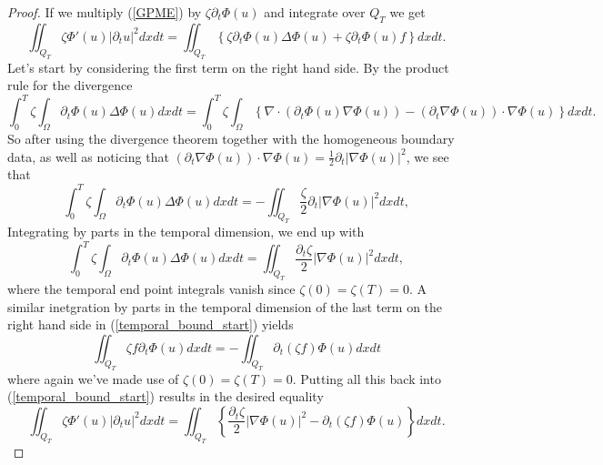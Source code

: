 \documentclass[11pt, a4paper]{article}
\begin{document}
\begin{proof}

 If we multiply (\ref{GPME}) by $\zeta \partial_t\Phi(u)$ and integrate over $Q_T$ we get
	\begin{equation}
	\label{temporal_bound_start}
	\iint_{Q_T}\zeta \Phi'(u)|\partial_t u|^2 dxdt = \iint_{Q_T} \left\{ \zeta \partial_t \Phi(u) \Delta \Phi(u)  + \zeta \partial_t \Phi(u) f \right\} dxdt.
	\end{equation}
	Let's start by considering the first term on the right hand side. By the product rule for the divergence
	\begin{equation*}
	\int_0^T \zeta \int_\Omega \partial_t \Phi(u) \Delta \Phi(u) dxdt = \int_0^T \zeta \int_\Omega \left\{ \nabla \cdot (\partial_t \Phi(u) \nabla \Phi(u)) - (\partial_t \nabla \Phi(u)) \cdot \nabla \Phi(u) \right\} dx dt.
	\end{equation*}
	So after using the divergence theorem together with the homogeneous boundary data, as well as noticing that $(\partial_t \nabla \Phi(u)) \cdot \nabla \Phi(u) = \frac{1}{2}\partial_t |\nabla \Phi(u)|^2$, we see that
	\begin{equation*}
	\int_0^T \zeta \int_\Omega \partial_t \Phi(u) \Delta \Phi(u) dxdt = -\iint_{Q_T}\frac{\zeta}{2}\partial_t |\nabla \Phi(u)|^2 dxdt,
	\end{equation*}
	Integrating by parts in the temporal dimension, we end up with
	\begin{equation*}
	\int_0^T \zeta \int_\Omega \partial_t \Phi(u) \Delta \Phi(u) dxdt = \iint_{Q_T} \frac{\partial_t \zeta}{2} |\nabla \Phi(u)|^2 dxdt,
	\end{equation*}
	where the temporal end point integrals vanish since $\zeta(0) = \zeta(T) = 0$.
	A similar inetgration by parts in the temporal dimension of the last term on the right hand side in (\ref{temporal_bound_start}) yields
	\begin{equation*}
	\iint_{Q_T} \zeta f \partial_t \Phi(u) dxdt = -\iint_{Q_T} \partial_t (\zeta f) \Phi(u) dxdt
	\end{equation*}
	where again we've made use of $\zeta(0) = \zeta(T) = 0$.
	Putting all this back into (\ref{temporal_bound_start}) results in the desired equality 
	\begin{equation}
	\iint_{Q_T} \zeta \Phi'(u) |\partial_t u|^2 dxdt = \iint_{Q_T} \left\{ \frac{\partial_t \zeta}{2}|\nabla \Phi(u)|^2 - \partial_t(\zeta f) \Phi(u) \right\} dxdt.
	\end{equation}
\end{proof}
\end{document}

